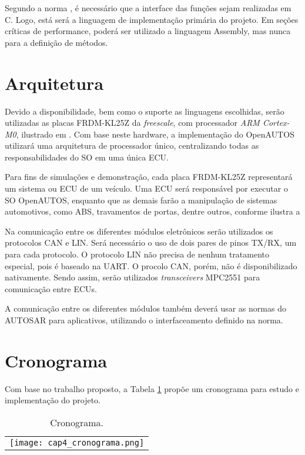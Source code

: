 Segundo a norma , é necessário que a interface das funções sejam realizadas em C. Logo, está será a linguagem de implementação primária do projeto. Em seções críticas de performance, poderá ser utilizado a linguagem Assembly, mas nunca para a definição de métodos.

\section{Arquitetura}

Devido a disponibilidade, bem como o suporte as linguagens escolhidas, serão utilizadas as placas FRDM-KL25Z da \emph{freescale}, com processador \emph{ARM Cortex-M0}, ilustrado em . Com base neste hardware, a implementação do OpenAUTOS utilizará uma arquitetura de processador único, centralizando todas as responsabilidades do SO em uma única ECU.


Para fins de simulações e demonstração, cada placa FRDM-KL25Z representará um sistema ou ECU de um veículo. Uma ECU será responsável por executar o SO OpenAUTOS, enquanto que as demais farão a manipulação de sistemas automotivos, como ABS, travamentos de portas, dentre outros, conforme ilustra a 


Na comunicação entre os diferentes módulos eletrônicos serão utilizados os protocolos CAN e LIN. Será necessário o uso de dois pares de pinos TX/RX, um para cada protocolo. O protocolo LIN não precisa de nenhum tratamento especial, pois é baseado na UART. O procolo CAN, porém, não é disponibilizado nativamente. Sendo assim, serão utilizados \emph{transceivers} MPC2551 para comunicação entre ECUs.

A comunicação entre os diferentes módulos também deverá usar as normas do AUTOSAR para aplicativos, utilizando o interfaceamento definido na norma.

\section{Cronograma}

Com base no trabalho proposto, a Tabela \ref{tab:cap4_cronograma} propõe um cronograma para estudo e implementação do projeto.

\begin{table}[h!]
	\centering
	\caption{Cronograma.}
	\begin{tabular}{c}
		\texttt{[image: cap4\_cronograma.png]}		
	\end{tabular}
	\label{tab:cap4_cronograma}
\end{table}
